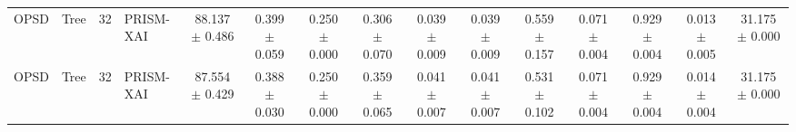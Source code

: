 \begin{table}[t]
\begin{tabular}{llllccccccccccc}
OPSD & Tree & 32 & PRISM-XAI & 88.137 $\pm$ 0.486 & 0.399 $\pm$ 0.059 & 0.250 $\pm$ 0.000 & 0.306 $\pm$ 0.070 & 0.039 $\pm$ 0.009 & 0.039 $\pm$ 0.009 & 0.559 $\pm$ 0.157 & 0.071 $\pm$ 0.004 & 0.929 $\pm$ 0.004 & 0.013 $\pm$ 0.005 & 31.175 $\pm$ 0.000 \\
OPSD & Tree & 32 & PRISM-XAI & 87.554 $\pm$ 0.429 & 0.388 $\pm$ 0.030 & 0.250 $\pm$ 0.000 & 0.359 $\pm$ 0.065 & 0.041 $\pm$ 0.007 & 0.041 $\pm$ 0.007 & 0.531 $\pm$ 0.102 & 0.071 $\pm$ 0.004 & 0.929 $\pm$ 0.004 & 0.014 $\pm$ 0.004 & 31.175 $\pm$ 0.000 \\
\bottomrule
\end{tabular}
\end{table}
